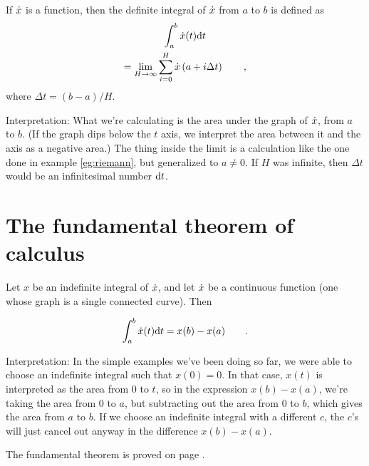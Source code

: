 \begin{important}
If $\dot{x}$ is a function, then the definite integral of $\dot{x}$ from $a$ to $b$ is
defined as
\begin{multline*}
  \int_{a}^{b} \dot{x}(t) \textup{d} t \\
= \lim_{H\rightarrow\infty} \sum_{i=0}^{H} \dot{x}\left(a+i\Delta t\right) \qquad ,
\end{multline*}
where $\Delta t=(b-a)/H$.

Interpretation: What we're calculating is
the area under the graph of $\dot{x}$, from $a$ to $b$. (If the graph dips below the $t$ axis, we interpret the
area between it and the axis as a negative area.)
The thing inside the limit is a calculation like the one done in example \ref{eg:riemann},
but generalized to $a\ne 0$.
If $H$ was infinite, then $\Delta t$ would be an infinitesimal number $\textup{d} t$. 
\end{important}

\section{The fundamental theorem of calculus}

\begin{important}
Let $x$ be an indefinite integral of $\dot{x}$, and let $\dot{x}$ be a continuous
function (one whose graph is a single connected curve). Then

\begin{equation*}
  \int_{a}^{b} \dot{x}(t) \textup{d} t = x(b)-x(a) \qquad .
\end{equation*}

Interpretation: In the simple examples we've been doing so far,
we were able to choose an indefinite integral such that $x(0)=0$.
In that case, $x(t)$ is interpreted as the area from 0 to $t$,
so in the expression $x(b)-x(a)$, we're taking the area from
0 to $a$, but subtracting out the area from 0 to $b$, which gives
the area from $a$ to $b$. If we choose an indefinite integral with
a different $c$, the $c$'s will just cancel out anyway in the
difference  $x(b)-x(a)$.
\end{important}

The fundamental theorem is proved on page \pageref{detour:fundamental-thm-proof}.

